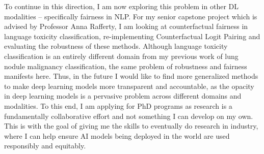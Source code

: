 \documentclass[10pt]{article}
\begin{document}
To continue in this direction, I am now exploring this problem in other DL modalities -- specifically fairness in NLP. For my senior capstone project which is advised by Professor Anna Rafferty, I am looking at counterfactual fairness in language toxicity classification, re-implementing Counterfactual Logit Pairing \cite{garg2019counterfactual} and evaluating the robustness of these methods. Although language toxicity classification is an entirely different domain from my previous work of lung nodule malignancy classification, the same problem of robustness and fairness manifests here. Thus, in the future I would like to find more generalized methods to make deep learning models more transparent and accountable, 
as the opacity in deep learning models is a pervasive problem across different domains and modalities.
To this end, I am applying for PhD programs as research is a fundamentally collaborative effort and not something I can develop on my own.
This is with the goal of giving me the skills to eventually do research in industry, where I can help ensure AI models being deployed in the world are used responsibly and equitably.
\end{document}
